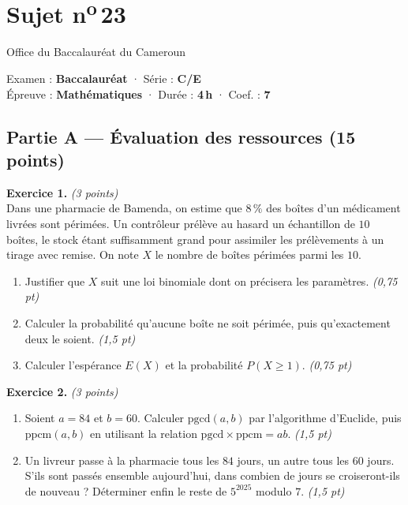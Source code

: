 \section{Sujet n\textsuperscript{o}\,23}
\noindent\begin{minipage}{0.5\linewidth}\footnotesize Office du Baccalauréat du Cameroun\end{minipage}%
\hfill\begin{minipage}{0.45\linewidth}\footnotesize\raggedleft Examen : \textbf{Baccalauréat} · Série : \textbf{C/E}\\
Épreuve : \textbf{Mathématiques} · Durée : \textbf{4\,h} · Coef. : \textbf{7}\end{minipage}
\par\smallskip{\color{onbo}\rule{\linewidth}{1pt}}

\subsection*{Partie A — Évaluation des ressources \hfill (15 points)}

\noindent\textbf{Exercice 1.} \hfill\textit{(3 points)}\\
Dans une pharmacie de Bamenda, on estime que $8\,\%$ des boîtes d'un médicament livrées
sont périmées. Un contrôleur prélève au hasard un échantillon de $10$ boîtes, le stock
étant suffisamment grand pour assimiler les prélèvements à un tirage avec remise. On note
$X$ le nombre de boîtes périmées parmi les $10$.
\begin{enumerate}[label=\arabic*)]
\item Justifier que $X$ suit une loi binomiale dont on précisera les paramètres. \hfill\textit{(0,75 pt)}
\item Calculer la probabilité qu'aucune boîte ne soit périmée, puis qu'exactement deux le soient. \hfill\textit{(1,5 pt)}
\item Calculer l'espérance $E(X)$ et la probabilité $P(X\ge1)$. \hfill\textit{(0,75 pt)}
\end{enumerate}

\smallskip
\noindent\textbf{Exercice 2.} \hfill\textit{(3 points)}\\
\begin{enumerate}[label=\arabic*)]
\item Soient $a=84$ et $b=60$. Calculer $\mathrm{pgcd}(a,b)$ par l'algorithme d'Euclide,
puis $\mathrm{ppcm}(a,b)$ en utilisant la relation $\mathrm{pgcd}\times\mathrm{ppcm}=ab$. \hfill\textit{(1,5 pt)}
\item Un livreur passe à la pharmacie tous les $84$ jours, un autre tous les $60$ jours.
S'ils sont passés ensemble aujourd'hui, dans combien de jours se croiseront-ils de nouveau ?
Déterminer enfin le reste de $5^{2025}$ modulo $7$. \hfill\textit{(1,5 pt)}
\end{enumerate}

